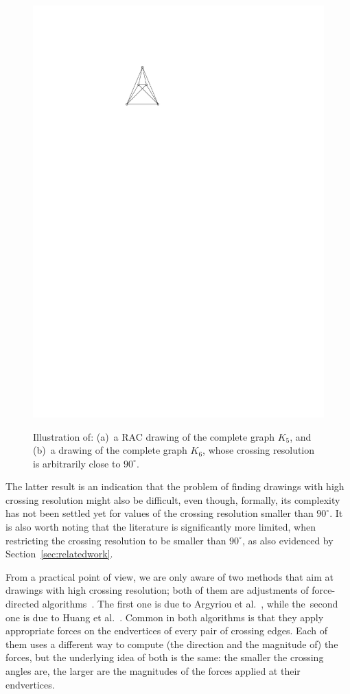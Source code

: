 \documentclass{comjnl}
\begin{document}
\begin{figure}[t!]
{	\includegraphics[page=2]{figures/examples}}
	\caption{Illustration of: %
	(a)~a RAC drawing of the complete graph $K_5$, and
	(b)~a drawing of the complete graph $K_6$, whose crossing resolution is arbitrarily close to $90^\circ$.}
	\label{fig:examples}
\end{figure}

The latter result is an indication that the problem of finding drawings with high crossing resolution might also be difficult, even though, formally, its complexity has not been settled yet for values of the crossing resolution smaller than $90^\circ$. It is also worth noting that the literature is significantly more limited, when restricting the crossing resolution to be smaller than $90^\circ$, as also evidenced by Section~\ref{sec:relatedwork}.

From a practical point of view, we are only aware of two methods that aim at drawings with high crossing resolution; both of them are adjustments of force-directed algorithms~\cite{DBLP:journals/congnum/Eades84}. The first one is due to Argyriou et al.~\cite{DBLP:journals/cj/ArgyriouBS13}, while the~second one is due to Huang et al.~\cite{DBLP:journals/vlc/HuangEHL13}. Common in both algorithms is that they apply appropriate forces on the endvertices of every pair of crossing edges. Each of them uses a different way to compute (the direction and the magnitude of) the forces, but the underlying idea of both is the same: the smaller the crossing angles are, the larger are the magnitudes of the forces applied at their endvertices.
\end{document}
